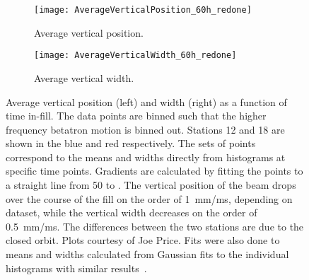 






\begin{figure}
\centering
    \begin{subfigure}[t]{0.48\textwidth}
        \centering
        \texttt{[image: AverageVerticalPosition\_60h\_redone]}
        \caption{Average vertical position.}
    \end{subfigure}
    \hspace{1mm}
    \begin{subfigure}[t]{0.48\textwidth}
        \centering
        \texttt{[image: AverageVerticalWidth\_60h\_redone]}
        \caption{Average vertical width.}
    \end{subfigure}
\caption[Beam average vertical position and width as a function of time in-fill]{Average vertical position (left) and width (right) as a function of time in-fill. The data points are binned such that the higher frequency betatron motion is binned out. Stations 12 and 18 are shown in the blue and red respectively. The sets of points correspond to the means and widths directly from histograms at specific time points. Gradients are calculated by fitting the points to a straight line from 50 to . The vertical position of the beam drops over the course of the fill on the order of \SI{1}{mm/ms}, depending on dataset, while the vertical width decreases on the order of \SI{0.5}{mm/ms}. The differences between the two stations are due to the closed orbit. Plots courtesy of Joe Price. Fits were also done to means and widths calculated from Gaussian fits to the individual histograms with similar results~\cite{BeamVerticalInfoTrackingElog}.}
\label{fig:BeamVerticalInfo}
\end{figure}




